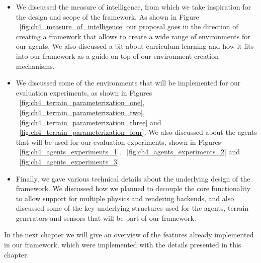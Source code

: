 \begin{itemize}
    \item We discussed the measure of intelligence, from which we take inspiration
          for the design and scope of the framework. As shown in Figure ~\ref{fig:ch4_measure_of_intelligence}
          our proposal goes in the direction of creating a framework that allows to
          create a wide range of environments for our agents. We also discussed a bit
          about curriculum learning and how it fits into our framework as a guide on
          top of our environment creation mechanisms.

    \item We discussed some of the environments that will be implemented for our
          evaluation experiments, as shown in Figures ~\ref{fig:ch4_terrain_parameterization_one},
          ~\ref{fig:ch4_terrain_parameterization_two}, ~\ref{fig:ch4_terrain_parameterization_three}
          and ~\ref{fig:ch4_terrain_parameterization_four}. We also discussed about the
          agents that will be used for our evaluation experiments, shown in Figures
          ~\ref{fig:ch4_agents_experiments_1}, ~\ref{fig:ch4_agents_experiments_2} and
          ~\ref{fig:ch4_agents_experiments_3}.

    \item Finally, we gave various technical details about the underlying design of
          the framework. We discussed how we planned to decouple the core functionality
          to allow support for multiple physics and rendering backends, and also discussed
          some of the key underlying structures used for the agents, terrain generators and
          sensors that will be part of our framework.
\end{itemize}

In the next chapter we will give an overview of the features already implemented in
our framework, which were implemented with the details presented in this chapter.

